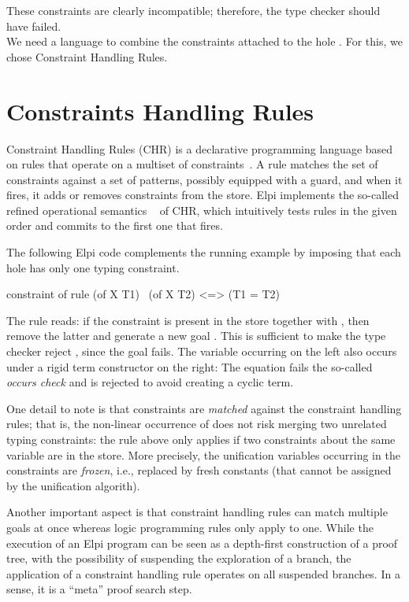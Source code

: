 \documentclass{these-ISSS}
\newenvironment{elpicode}
  {\VerbatimEnvironment\begin{elpibox}\begin{xelpicode}}{\end{xelpicode}
\end{elpibox}}
\begin{document}
These constraints are clearly incompatible; therefore, the type checker
should have failed.
~\\

We need a language to combine the constraints attached to the hole
. For this, we chose Constraint Handling Rules.

\section{Constraints Handling Rules}\label{sec:chrui}


Constraint Handling Rules (CHR) is a declarative programming language based
on rules that operate on a multiset of constraints~\cite{chr}. A rule matches
the set of constraints against a set of patterns, possibly equipped with a
guard, and when it fires, it adds or removes constraints from the store.
Elpi implements the so-called refined operational semantics
~\cite{10.1007/978-3-540-27775-0_7} of CHR, which intuitively tests rules in
the given order and commits to the first one that fires.

The following Elpi code complements the running example by imposing that each
hole has only one typing constraint.

\begin{elpicode}
constraint of {
  rule (of X T1) \ (of X T2) <=> (T1 = T2)
}
\end{elpicode}


The rule reads: if the constraint  is present in the store
together with , then remove the latter and generate a new goal
. This is sufficient to make the type checker reject
, since the goal  fails.
The variable  occurring on the left also
occurs under a rigid term constructor  on the right:
The equation fails the so-called \emph{occurs check} and is rejected
to avoid creating a cyclic term.

One detail to note is that constraints are \emph{matched} against the constraint
handling rules; that is, the non-linear occurrence of  does not risk
merging two unrelated typing constraints: the rule above only applies if two
constraints about the same variable are in the store. More precisely, the
unification variables occurring in the constraints are \emph{frozen}, i.e.,
replaced by fresh constants (that cannot be assigned by the unification algorith).

Another important aspect is that constraint handling rules can match multiple
goals at once whereas logic programming rules only apply to one. While
the execution of an Elpi program can be seen as a depth-first construction of
a proof tree, with the possibility of suspending the exploration of a branch,
the application of a constraint handling rule operates on all suspended
branches. In a sense, it is a ``meta'' proof search step.
\end{document}
